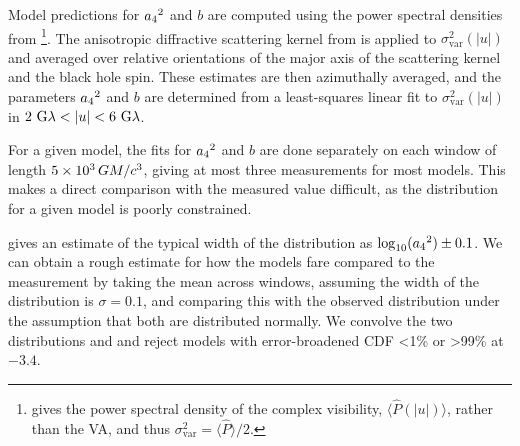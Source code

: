 Model predictions for ${a_4}^2$ and $b$ are computed using the power spectral densities from \citet{Georgiev_2022}\footnote{\citet{Georgiev_2022} gives the power spectral density of the complex visibility, $\langle\hat{P}(|u|)\rangle$, rather than the VA, and thus $\sigma_\text{var}^2=\langle \hat{P}\rangle/2$.}.
The anisotropic diffractive scattering kernel from \citet{Johnson_2018} is applied to $\sigma_\text{var}^2(|u|)$ and averaged over relative orientations of the major axis of the scattering kernel and the black hole spin.
These estimates are then azimuthally averaged, and the parameters ${a_4}^2$ and $b$ are determined from a least-squares linear fit to $\sigma_\text{var}^2(|u|)$ in $2~{\rm G}\lambda < |u| < 6~{\rm G}\lambda$.

For a given model, the fits for ${a_4}^2$ and $b$ are done separately on each window of length $5 \times 10^3\,GM/c^3$, giving at most three measurements for most models.
This makes a direct comparison with the measured value difficult, as the distribution for a given model is poorly constrained.

\citet{Georgiev_2022} gives an estimate of the typical width of the distribution as $\log_{10}({a_4}^2) \pm 0.1$.
We can obtain a rough estimate for how the models fare compared to the measurement by taking the mean across windows, assuming the width of the distribution is $\sigma = 0.1$, and comparing this with the observed distribution under the assumption that both are distributed normally.
We convolve the two distributions and and reject models with error-broadened CDF <1\% or >99\% at $-3.4$.

